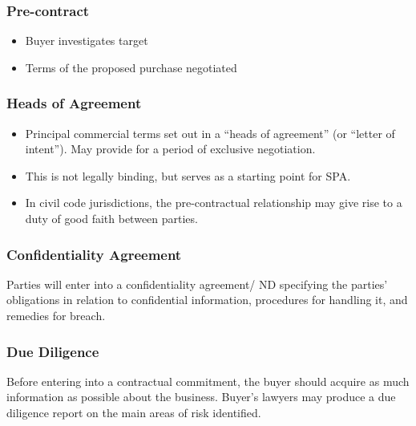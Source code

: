 \documentclass[
]{article}
\providecommand{\tightlist}{%
  \setlength{\itemsep}{0pt}\setlength{\parskip}{0pt}}
\begin{document}
\hypertarget{pre-contract}{%
\subsubsection{Pre-contract}\label{pre-contract}}

\begin{itemize}
\tightlist
\item
  Buyer investigates target
\item
  Terms of the proposed purchase negotiated
\end{itemize}

\hypertarget{heads-of-agreement}{%
\subsubsection{Heads of Agreement}\label{heads-of-agreement}}

\begin{itemize}
\tightlist
\item
  Principal commercial terms set out in a ``heads of agreement'' (or
  ``letter of intent''). May provide for a period of exclusive
  negotiation.
\item
  This is not legally binding, but serves as a starting point for SPA.
\item
  In civil code jurisdictions, the pre-contractual relationship may give
  rise to a duty of good faith between parties.
\end{itemize}

\hypertarget{confidentiality-agreement}{%
\subsubsection{Confidentiality
Agreement}\label{confidentiality-agreement}}

Parties will enter into a confidentiality agreement/ ND specifying the
parties' obligations in relation to confidential information, procedures
for handling it, and remedies for breach.

\hypertarget{due-diligence}{%
\subsubsection{Due Diligence}\label{due-diligence}}

Before entering into a contractual commitment, the buyer should acquire
as much information as possible about the business. Buyer's lawyers may
produce a due diligence report on the main areas of risk identified.
\end{document}
